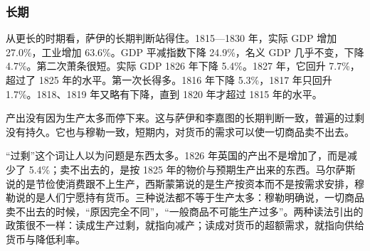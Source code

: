 
\subsubsection{长期}
从更长的时期看，萨伊的长期判断站得住。1815—1830 年，实际 GDP 增加 27.0\%，工业增加 63.6\%。GDP 平减指数下降 24.9\%，名义 GDP 几乎不变，下降 4.7\%\cite{broadberry2015,boe2017}。第二次萧条很短。实际 GDP 1826 年下降 5.4\%。1827 年，它回升 7.7\%，超过了 1825 年的水平。第一次长得多。1816 年下降 5.3\%，1817 年只回升 1.7\%。1818、1819 年又略有下降，直到 1820 年才超过 1815 年的水平。

产出没有因为生产太多而停下来。这与萨伊和李嘉图的长期判断一致，普遍的过剩没有持久。它也与穆勒一致，短期内，对货币的需求可以使一切商品卖不出去。

\begin{pitfall}[普遍过剩就是生产太多]
“过剩”这个词让人以为问题是东西太多。1826 年英国的产出不是增加了，而是减少了 5.4\%；卖不出去的，是按 1825 年的物价与预期生产出来的东西。马尔萨斯说的是节俭使消费跟不上生产，西斯蒙第说的是生产按资本而不是按需求安排，穆勒说的是人们宁愿持有货币。三种说法都不等于生产太多：穆勒明确说，一切商品卖不出去的时候，“原因完全不同”，“一般商品不可能生产过多”\cite{jsmill1844}。两种读法引出的政策很不一样：读成生产过剩，就指向减产；读成对货币的超额需求，就指向供给货币与降低利率。
\end{pitfall}

